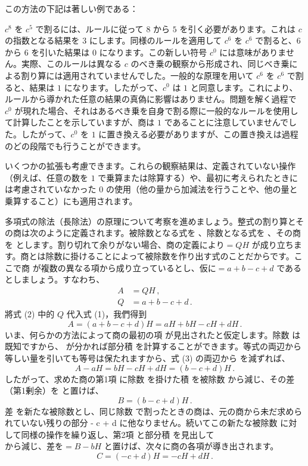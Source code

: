 \documentclass[a4paper,11pt,openany]{ltjsbook}
\begin{document}
この方法の下記は著しい例である：

$c^{8}$ を $c^{5}$ で割るには、ルールに従って $8$ から $5$ を引く必要があります。これは $c$ の指数となる結果を $3$ にします。同様のルールを適用して $c^{6}$ を $c^{6}$ で割ると、$6$ から $6$ を引いた結果は $0$ になります。この新しい符号 $c^{0}$ には意味がありません。実際、このルールは異なる $c$ のべき乗の観察から形成され、同じべき乗による割り算には適用されていませんでした。一般的な原理を用いて $c^{6}$ を $c^{6}$ で割ると、結果は $1$ になります。したがって、$c^{0}$ は $1$ と同意します。これにより、ルールから導かれた任意の結果の真偽に影響はありません。問題を解く過程で $c^{0}$ が現れた場合、それはあるべき乗を自身で割る際に一般的なルールを使用して計算したことを示していますが、商は $1$ であることに注意していませんでした。したがって、$c^{0}$ を $1$ に置き換える必要がありますが、この置き換えは過程のどの段階でも行うことができます。

いくつかの拡張も考慮できます。これらの観察結果は、定義されていない操作（例えば、任意の数を $1$ で乗算または除算する）や、最初に考えられたときには考慮されていなかった $0$ の使用（他の量から加減法を行うことや、他の量と乗算すること）にも適用されます。

多項式の除法（長除法）の原理について考察を進めましょう。整式の割り算とその商は次のように定義されます。被除数となる式を 、除数となる式を 、その商を $ とします。割り切れて余りがない場合、商の定義により  = QH$ が成り立ちます。商とは除数に掛けることによって被除数を作り出す式のことだからです。ここで商 $ が複数の異なる項から成り立っているとし、仮に  = a + b - c + d$ であるとしましょう。すなわち、
\begin{align*}
A &= QH\,, \tag{1} \\
Q &= a + b - c + d\,. \tag{2}
\end{align*}
將式 (2) 中的 $Q$ 代入式 (1)，我們得到
\[
A = (a + b - c + d)H = aH + bH - cH + dH\,. \tag{3}
\]
いま、何らかの方法によって商の最初の項  が見出されたと仮定します。除数  は既知ですから、 が分かれば部分積  を計算することができます。等式の両辺から等しい量を引いても等号は保たれますから、式 (3) の両辺から  を減ずれば、
\[
A - aH = bH - cH + dH = (b - c + d)H\,. \tag{4}
\]
したがって、求めた商の第1項  に除数  を掛けた積  を被除数  から減じ、その差（第1剰余）を  と置けば、
\[
B = (b - c + d)H\,. \tag{5}
\]
差  を新たな被除数とし、同じ除数  で割ったときの商は、元の商から未だ求められていない残りの部分  - c + d に他なりません。続いてこの新たな被除数  に対して同様の操作を繰り返し、第2項  と部分積  を見出して $ から減じ、差を  = B - bH$ と置けば、次々に商の各項が導き出されます。
\[
C = (-c + d)H = -cH + dH\,. \tag{6}
\]
\end{document}

